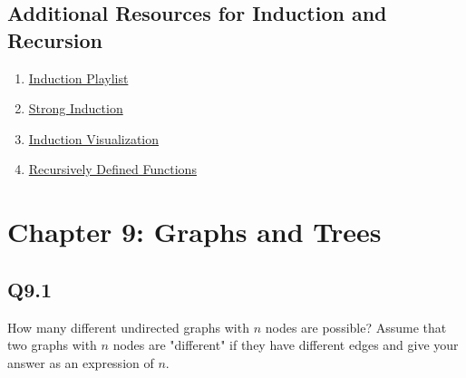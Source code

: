 \documentclass{article}
\begin{document}
\subsection*{Additional Resources for Induction and Recursion}
\begin{enumerate}
    \item \href{https://www.youtube.com/watch?v=IdTaA6iz3Mo&list=PL5KkMZvBpo5CnkA4bi7l6W62VPoYRbOEk&index=1}{Induction Playlist}
    \item \href{https://www.youtube.com/watch?v=-vJhahLdmLI}{Strong Induction}
    \item \href{https://www.youtube.com/watch?v=5Hn8vUE3cBQ}{Induction Visualization}
    \item \href{https://www.youtube.com/watch?v=5RB4H_12wOs}{Recursively Defined Functions}
\end{enumerate}
\newpage
{} \section*{Chapter 9: Graphs and Trees}
\subsection*{Q9.1}
How many different undirected graphs with $n$ nodes are possible? Assume that two graphs with $n$ nodes are "different" if they have different edges and give your answer as an expression of $n$.
\newpage
{}
\end{document}
